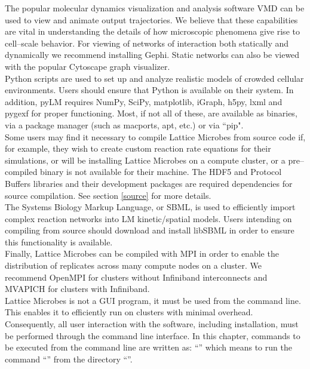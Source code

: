The popular molecular dynamics visualization and analysis software VMD can be used to view and animate output trajectories.  We believe that these capabilities are vital in understanding the details of how microscopic phenomena give rise to cell--scale behavior. For viewing of networks of interaction both statically and dynamically we recommend installing Gephi. Static networks can also be viewed with the popular Cytoscape graph visualizer. \\

Python scripts are used to set up and analyze realistic models of crowded cellular environments.  Users should ensure that Python is available on their system.  In addition, pyLM requires NumPy, SciPy, matplotlib, iGraph, h5py, lxml and pygexf for proper functioning. Most, if not all of these, are available as binaries, via a package manager (such as macports, apt, etc.) or via ``pip".\\

Some users may find it necessary to compile Lattice Microbes from source
code if, for example, they wish to create custom reaction rate equations
for their simulations, or will be installing Lattice Microbes on a compute
cluster, or a pre--compiled binary is not available for their machine.
The HDF5 and Protocol Buffers libraries and their development packages are required 
dependencies for source compilation.  See section \ref{source} for more
details.\\

The Systems Biology Markup Language, or SBML, is used to efficiently import complex reaction networks into LM kinetic/spatial models.  Users intending on compiling from source should download and install libSBML in order to ensure this functionality is available. \\

Finally, Lattice Microbes can be compiled with MPI in order to enable the distribution of replicates across many compute nodes on a cluster.  We recommend OpenMPI for clusters without Infiniband interconnects and MVAPICH for clusters with Infiniband.\\

Lattice Microbes is not a GUI program, it must be used from the command line. This enables it to efficiently run on  clusters with minimal overhead. Consequently, all user interaction with the software, including installation, must be performed through the command line interface. In this chapter, commands to be executed from the command line are written as: ``'' which means to run the command ``'' from the directory ``''.

